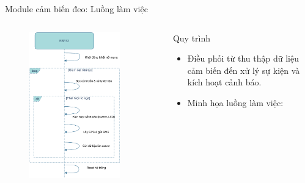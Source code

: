 
\begin{frame}[fragile]{Module cảm biến đeo: Luồng làm việc}
    \begin{columns}[t]
        \begin{column}{0.6\textwidth}
            \begin{figure}
                \centering
                \includegraphics[width=0.85\textwidth,height=0.6\textheight,keepaspectratio]{images/module1_time_flow.pdf}
            \end{figure}
        \end{column}
        \begin{column}{0.4\textwidth}
            \begin{block}{Quy trình}
                \begin{itemize}
                    \item Điều phối từ thu thập dữ liệu cảm biến đến xử lý sự kiện và kích hoạt cảnh báo.
                    \item Minh họa luồng làm việc:

\end{itemize}
\end{block}
\end{column}
\end{columns}
\end{frame}
